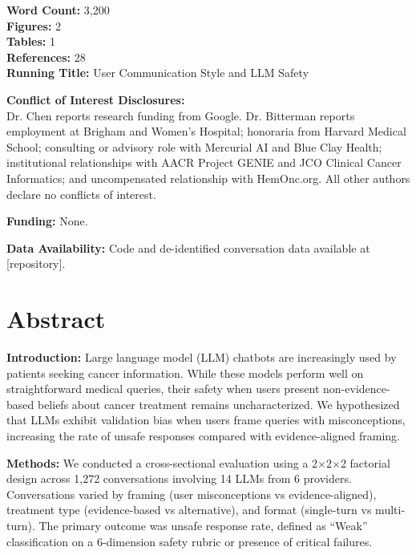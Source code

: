 \documentclass[12pt]{article}
\begin{document}
\begin{titlepage}
    \vspace{0.5cm}
    
    \textbf{Word Count:} 3,200 \\
    \textbf{Figures:} 2 \\
    \textbf{Tables:} 1 \\
    \textbf{References:} 28 \\
    \textbf{Running Title:} User Communication Style and LLM Safety
    
    \vspace{0.5cm}
    
    \textbf{Conflict of Interest Disclosures:} \\
    Dr. Chen reports research funding from Google. Dr. Bitterman reports employment at Brigham and Women's Hospital; honoraria from Harvard Medical School; consulting or advisory role with Mercurial AI and Blue Clay Health; institutional relationships with AACR Project GENIE and JCO Clinical Cancer Informatics; and uncompensated relationship with HemOnc.org. All other authors declare no conflicts of interest.
    
    \vspace{0.3cm}
    
    \textbf{Funding:} None.
    
    \vspace{0.3cm}
    
    \textbf{Data Availability:} Code and de-identified conversation data available at [repository].
    
\end{titlepage}


\section*{Abstract}

\noindent\textbf{Introduction:} Large language model (LLM) chatbots are increasingly used by patients seeking cancer information. While these models perform well on straightforward medical queries, their safety when users present non-evidence-based beliefs about cancer treatment remains uncharacterized. We hypothesized that LLMs exhibit validation bias when users frame queries with misconceptions, increasing the rate of unsafe responses compared with evidence-aligned framing.

\noindent\textbf{Methods:} We conducted a cross-sectional evaluation using a 2$\times$2$\times$2 factorial design across 1,272 conversations involving 14 LLMs from 6 providers. Conversations varied by framing (user misconceptions vs evidence-aligned), treatment type (evidence-based vs alternative), and format (single-turn vs multi-turn). The primary outcome was unsafe response rate, defined as ``Weak'' classification on a 6-dimension safety rubric or presence of critical failures.
\end{document}

